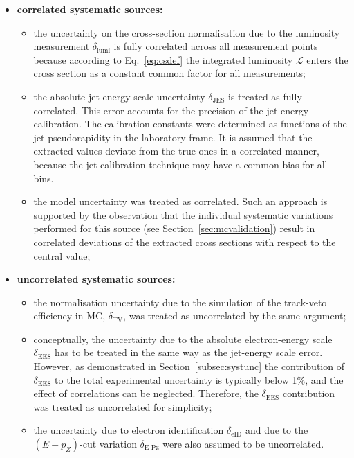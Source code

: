 \begin{itemize}
 \item \textbf{correlated systematic sources:}
 \begin{itemize}
 \item the uncertainty on the cross-section normalisation due to the luminosity measurement $\delta_\text{lumi}$ is fully correlated across all measurement points because according to Eq.~\eqref{eq:csdef} the integrated luminosity $\mathcal{L}$ enters the cross section as a constant common factor for all measurements;
 \item the absolute jet-energy scale uncertainty $\delta_\text{JES}$ is treated as fully correlated. This error accounts for the precision of the jet-energy calibration. The calibration constants were determined as functions of the jet pseudorapidity in the laboratory frame. It is assumed that the extracted values deviate from the true ones in a correlated manner, because the jet-calibration technique may have a common bias for all bins.
 \item the model uncertainty was treated as correlated. Such an approach is supported by the observation that the individual systematic variations performed for this source (see Section~\ref{sec:mcvalidation}) result in correlated deviations of the extracted cross sections with respect to the central value;
 \end{itemize}
 \item \textbf{uncorrelated systematic sources:}
 \begin{itemize}
 \item the normalisation uncertainty due to the simulation of the track-veto efficiency in MC, $\delta_\text{TV}$, was treated as uncorrelated by the same argument;
 \item conceptually, the uncertainty due to the absolute electron-energy scale $\delta_\text{EES}$ has to be treated in the same way as the jet-energy scale error. However, as demonstrated in Section~\ref{subsec:systunc} the contribution of $\delta_\text{EES}$ to the total experimental uncertainty is typically below 1\%, and the effect of correlations can be neglected. Therefore, the $\delta_\text{EES}$ contribution was treated as uncorrelated for simplicity;
 \item the uncertainty due to electron identification $\delta_\text{eID}$ and due to the $\left(E-p_Z\right)$-cut variation $\delta_\text{E-Pz}$ were also assumed to be uncorrelated.
 \end{itemize}
\end{itemize}
